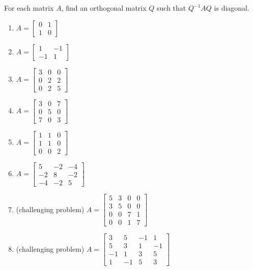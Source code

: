 \documentclass{ximera}
\begin{document}
\begin{problem}\label{prob:findQ}
For each matrix $A$, find an orthogonal matrix $Q$ such that $Q^{-1}AQ$ is diagonal.

\begin{enumerate}
\item\label{prob:findQa} $A = \begin{bmatrix}
0 & 1 \\
1 & 0
\end{bmatrix}$

\item\label{prob:findQb} $A = \begin{bmatrix}
1 & -1 \\
-1 & 1
\end{bmatrix}$

\item\label{prob:findQc} $A = \begin{bmatrix}
3 & 0 & 0 \\
0 & 2 & 2 \\
0 & 2 & 5
\end{bmatrix}$

\item\label{prob:findQd} $A = \begin{bmatrix}
3 & 0 & 7 \\
0 & 5 & 0 \\
7 & 0 & 3
\end{bmatrix}$

\item\label{prob:findQe} $A = \begin{bmatrix}
1 & 1 & 0 \\
1 & 1 & 0 \\
0 & 0 & 2
\end{bmatrix}$

\item $A = \begin{bmatrix}
5 & -2 & -4 \\
-2 & 8 & -2\\
-4 & -2 & 5
\end{bmatrix}$
\item\label{prob:findQf} (challenging problem) $A = \begin{bmatrix}
5 & 3 & 0 & 0 \\
3 & 5 & 0 & 0 \\
0 & 0 & 7 & 1 \\
0 & 0 & 1 & 7
\end{bmatrix}$

\item\label{prob:findQg} (challenging problem) $A = \begin{bmatrix}
3 & 5 & -1 & 1 \\
5 & 3 & 1 & -1 \\
-1 & 1 & 3 & 5 \\
1 & -1 & 5 & 3
\end{bmatrix}$
\end{enumerate}


\end{problem}
\end{document}
